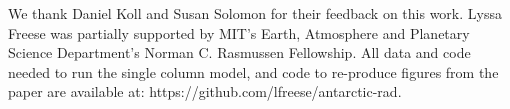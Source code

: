 \documentclass[draft]{agujournal2019}
\begin{document}
%




%
%
%
%
%
%
%
%


\acknowledgments
We thank Daniel Koll and Susan Solomon for their feedback on this work. Lyssa Freese was partially supported by MIT's Earth, Atmosphere and Planetary Science Department's Norman C. Rasmussen Fellowship. All data and code needed to run the single column model, and code to re-produce figures from the paper are available at: https://github.com/lfreese/antarctic-rad. 



%
%





%
%
%
%
%
\end{document}
